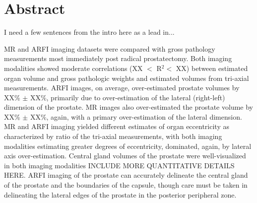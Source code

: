 \section*{Abstract}
I need a few sentences from the intro here as a lead in...

MR and ARFI imaging datasets were compared with gross pathology measurements
most immediately post radical prostatectomy.  Both imaging modalities showed
moderate correlations (XX $<$ R$^2 < $ XX) between estimated organ volume and
gross pathologic weights and estimated volumes from tri-axial measurements.
ARFI images, on average, over-estimated prostate volumes by XX\% $\pm$ XX\%,
primarily due to over-estimation of the lateral (right-left) dimension of the
prostate.  MR images also over-estimated the prostate volume by XX\% $\pm$
XX\%, again, with a primary over-estimation of the lateral dimension.  MR and
ARFI imaging yielded different estimates of organ eccentricity as
characterized by ratio of the tri-axial measurements, with both imaging
modalities estimating greater degrees of eccentricity, dominated, again, by
lateral axis over-estimation.  Central gland volumes of the prostate were
well-visualized in both imaging modalities INCLUDE MORE QUANTITATIVE DETAILS
HERE.  ARFI imaging of the prostate can accurately delineate the central gland
of the prostate and the boundaries of the capsule, though care must be taken in
delineating the lateral edges of the prostate in the posterior peripheral zone.
